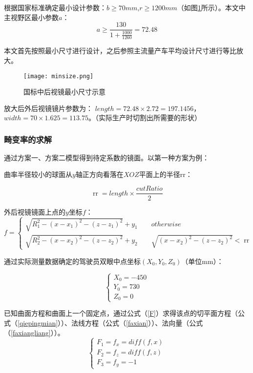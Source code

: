 \documentclass[withoutpreface,bwprint]{cumcmthesis} %
\begin{document}
\par 根据国家标准确定最小设计参数：$b \geqslant 70mm$,$r \geqslant 1200mm$（如图\ref{fig:后视镜最小尺寸示意}所示）。本文中主视野区最小参数$a$：
$$a \geqslant \frac{130}{1+\frac{1000}{1260}} = 72.48$$

\par 本文首先按照最小尺寸进行设计，之后参照主流量产车平均设计尺寸进行等比放大。
\begin{figure}[h]
\small
\centering
\texttt{[image: minsize.png]}
\caption{国标中后视镜最小尺寸示意} \label{fig:后视镜最小尺寸示意}
\end{figure}

\par 放大后外后视镜镜片参数为：
$length = 72.48\times 2.72 = 197.1456$，            
$width = 70 \times 1.625 = 113.75$。（实际生产时切割出所需要的形状）

\subsubsection{畸变率的求解}

\par 通过方案一、方案二模型得到待定系数的镜面。以第一种方案为例：
\par 曲率半径较小的球面从$y$轴正方向看落在$XOZ$平面上的半径rr：

\begin{equation}
	\mathop{rr} = length \times \frac{cutRatio}{2}
\end{equation}

\par 外后视镜镜面上点的$y$坐标$f$：
\begin{equation}
	f = 
	\begin{cases}
		\sqrt{R_1^2 - (x-x_1)^2 - (z - z_1)^2} + y_1\quad \quad otherwise
		\\
		\sqrt{R_2^2 - (x-x_2)^2 - (z - z_2)^2} + y_2 \quad \quad 
		\sqrt{(x-x_2)^2 - (z - z_2)^2} < \mathop{rr} 
	\end{cases} 
\end{equation}

\par 通过实际测量数据确定的驾驶员双眼中点坐标$(X_0,Y_0,Z_0)$（单位mm）：

\begin{equation}
	\begin{cases}
		X_0 = -450 \\ 
		Y_0 = 730 \\
		Z_0 = 0 
	\end{cases} 
\end{equation}
\par 已知曲面方程和曲面上一个固定点，通过公式（\ref{F}）求得该点的切平面方程（公式（\ref{qiepingmian}））、法线方程（公式（\ref{faxian}））、法向量（公式（\ref{faxiangliang}））。
\begin{equation}
\label{F}
	\begin{cases}
		F_1 = f_x = diff(f,x) \\
		F_2 = f_z = diff(f,z) \\
		F_3 = f_y = -1
	\end{cases}
\end{equation}
\end{document}
